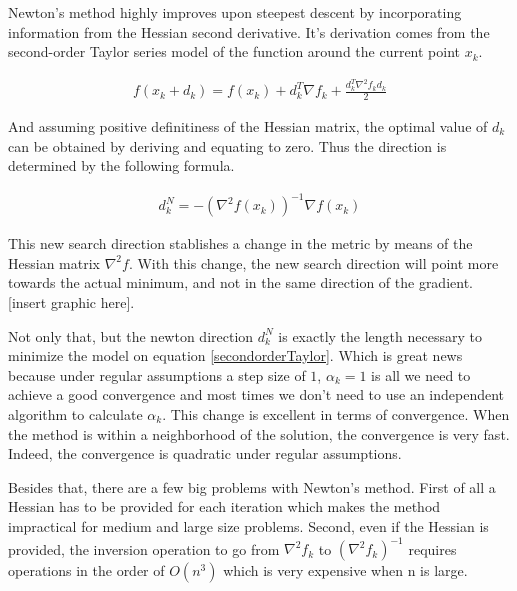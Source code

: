 Newton's method highly improves upon steepest descent by incorporating information from the Hessian second derivative.   It's derivation comes from the second-order Taylor series model of the function around the current point $x_k$. 

\begin{equation} \label{secondorderTaylor}
  \begin{aligned}
    f(x_k + d_k) = f(x_k) + d_k^T \nabla f_k + \frac{d_k^T \nabla ^2 f_k d_k}{2}  
  \end{aligned}
\end{equation}

And assuming positive definitiness of the Hessian matrix, the optimal value of $d_k$ can be obtained by deriving and equating to zero.  Thus the direction is determined by the following formula.

\begin{equation} \label{NewtonDir}
  \begin{aligned}
    d_k^N = -\left(\nabla^2 f(x_k) \right)^{-1} \nabla f(x_k)
  \end{aligned}
\end{equation}

This new search direction stablishes a change in the metric by means of the Hessian matrix $\nabla ^2 f$.  With this change, the new search direction will point more towards the actual minimum, and not in the same direction of the gradient. [insert graphic here].

Not only that, but the newton direction $d_k^N$ is exactly the length necessary to minimize the model on equation \ref{secondorderTaylor}.  Which is great news because under regular assumptions a step size of $1$, $\alpha_k = 1$ is all we need to achieve a good convergence and most times we don't need to use an independent algorithm to calculate $\alpha_k$.  This change is excellent in terms of convergence.  When the method is within a neighborhood of the solution, the convergence is very fast.  Indeed, the convergence is quadratic under regular assumptions\citep{nocedal}.

Besides that, there are a few big problems with Newton's method.  First of all a Hessian has to be provided for each iteration which makes the method impractical for medium and large size problems.  Second, even if the Hessian is provided, the inversion operation to go from $\nabla^2 f_k$ to $\left(\nabla^2 f_k \right)^{-1}$ requires operations in the order of $O(n^3)$ which is very expensive when n is large.

